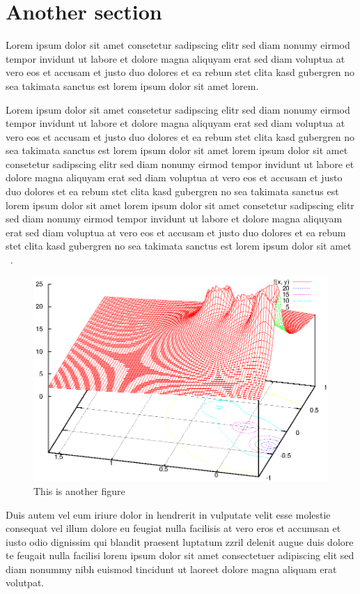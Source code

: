 \section{Another section}

Lorem ipsum dolor sit amet consetetur sadipscing elitr sed diam
nonumy eirmod tempor invidunt ut labore et dolore magna aliquyam
erat sed diam voluptua at vero eos et accusam et justo duo dolores
et ea rebum stet clita kasd gubergren no sea takimata sanctus est
lorem ipsum dolor sit amet lorem.~\cite{XIAOAPL05}

Lorem ipsum dolor sit amet consetetur sadipscing elitr sed diam
nonumy eirmod tempor invidunt ut labore et dolore magna aliquyam
erat sed diam voluptua at vero eos et accusam et justo duo dolores
et ea rebum stet clita kasd gubergren no sea takimata sanctus est
lorem ipsum dolor sit amet lorem ipsum dolor sit amet consetetur
sadipscing elitr sed diam nonumy eirmod tempor invidunt ut labore
et dolore magna aliquyam erat sed diam voluptua at vero eos et
accusam et justo duo dolores et ea rebum stet clita kasd gubergren
no sea takimata sanctus est lorem ipsum dolor sit amet lorem ipsum
dolor sit amet consetetur sadipscing elitr sed diam nonumy eirmod
tempor invidunt ut labore et dolore magna aliquyam erat sed diam
voluptua at vero eos et accusam et justo duo dolores et ea rebum
stet clita kasd gubergren no sea takimata sanctus est lorem ipsum
dolor sit amet ~.

\begin{figure}[htb]
\centering\includegraphics[width=.75\textwidth]{figuras/exemplo1.eps}
\caption{This is another figure}
\label{fig:fig2}
\end{figure}

Duis autem vel eum iriure dolor in hendrerit in vulputate velit
esse molestie consequat vel illum dolore eu feugiat nulla
facilisis at vero eros et accumsan et iusto odio dignissim qui
blandit praesent luptatum zzril delenit augue duis dolore te
feugait nulla facilisi lorem ipsum dolor sit amet consectetuer
adipiscing elit sed diam nonummy nibh euismod tincidunt ut laoreet
dolore magna aliquam erat volutpat.


